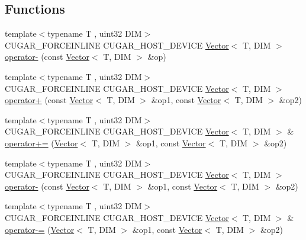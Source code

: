 \subsection*{Functions}
\begin{DoxyCompactItemize}
\item 
{\footnotesize template$<$typename T , uint32 D\+IM$>$ }\\C\+U\+G\+A\+R\+\_\+\+F\+O\+R\+C\+E\+I\+N\+L\+I\+NE C\+U\+G\+A\+R\+\_\+\+H\+O\+S\+T\+\_\+\+D\+E\+V\+I\+CE \hyperlink{structcugar_1_1_vector}{Vector}$<$ T, D\+IM $>$ \hyperlink{group___vectors_module_ga79019254703773ad3d352a503d3d820a}{operator-\/} (const \hyperlink{structcugar_1_1_vector}{Vector}$<$ T, D\+IM $>$ \&op)
\item 
{\footnotesize template$<$typename T , uint32 D\+IM$>$ }\\C\+U\+G\+A\+R\+\_\+\+F\+O\+R\+C\+E\+I\+N\+L\+I\+NE C\+U\+G\+A\+R\+\_\+\+H\+O\+S\+T\+\_\+\+D\+E\+V\+I\+CE \hyperlink{structcugar_1_1_vector}{Vector}$<$ T, D\+IM $>$ \hyperlink{group___vectors_module_ga489fb43a70bf29d1770cfe886bc225f2}{operator+} (const \hyperlink{structcugar_1_1_vector}{Vector}$<$ T, D\+IM $>$ \&op1, const \hyperlink{structcugar_1_1_vector}{Vector}$<$ T, D\+IM $>$ \&op2)
\item 
{\footnotesize template$<$typename T , uint32 D\+IM$>$ }\\C\+U\+G\+A\+R\+\_\+\+F\+O\+R\+C\+E\+I\+N\+L\+I\+NE C\+U\+G\+A\+R\+\_\+\+H\+O\+S\+T\+\_\+\+D\+E\+V\+I\+CE \hyperlink{structcugar_1_1_vector}{Vector}$<$ T, D\+IM $>$ \& \hyperlink{group___vectors_module_gab459e58fcb21396fafa8f4a2d562a8e1}{operator+=} (\hyperlink{structcugar_1_1_vector}{Vector}$<$ T, D\+IM $>$ \&op1, const \hyperlink{structcugar_1_1_vector}{Vector}$<$ T, D\+IM $>$ \&op2)
\item 
{\footnotesize template$<$typename T , uint32 D\+IM$>$ }\\C\+U\+G\+A\+R\+\_\+\+F\+O\+R\+C\+E\+I\+N\+L\+I\+NE C\+U\+G\+A\+R\+\_\+\+H\+O\+S\+T\+\_\+\+D\+E\+V\+I\+CE \hyperlink{structcugar_1_1_vector}{Vector}$<$ T, D\+IM $>$ \hyperlink{group___vectors_module_ga0e674f7f0f36bd82e3fec0c821114d67}{operator-\/} (const \hyperlink{structcugar_1_1_vector}{Vector}$<$ T, D\+IM $>$ \&op1, const \hyperlink{structcugar_1_1_vector}{Vector}$<$ T, D\+IM $>$ \&op2)
\item 
{\footnotesize template$<$typename T , uint32 D\+IM$>$ }\\C\+U\+G\+A\+R\+\_\+\+F\+O\+R\+C\+E\+I\+N\+L\+I\+NE C\+U\+G\+A\+R\+\_\+\+H\+O\+S\+T\+\_\+\+D\+E\+V\+I\+CE \hyperlink{structcugar_1_1_vector}{Vector}$<$ T, D\+IM $>$ \& \hyperlink{group___vectors_module_ga91cd021cf4fdca7eb4036efe1ea0798c}{operator-\/=} (\hyperlink{structcugar_1_1_vector}{Vector}$<$ T, D\+IM $>$ \&op1, const \hyperlink{structcugar_1_1_vector}{Vector}$<$ T, D\+IM $>$ \&op2)

\end{DoxyCompactItemize}
